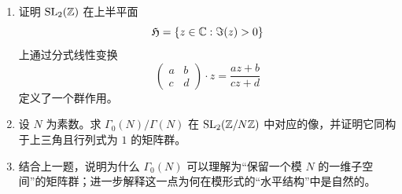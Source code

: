 \begin{enumerate}[start=56, label=\textbf{习题6.\arabic*.}, leftmargin=7em]
  \[
    \SL_2(\Z)/\Gamma(N) \cong \SL_2(\Z/N\Z).
  \]
  \item \hard 证明 $\mathrm{SL}_2(\mathbb{Z})$ 在上半平面
  \[
    \mathfrak{H}=\{z\in \mathbb{C}: \Im(z)>0\}
  \]
  上通过分式线性变换
  \[
    \begin{pmatrix}a&b\\ c&d\end{pmatrix}·z=\frac{az+b}{cz+d}
  \]
  定义了一个群作用。
  \item \hard 设 $N$ 为素数。求 $\Gamma_0(N)/\Gamma(N)$ 在 $\mathrm{SL}_2(\mathbb{Z}/N\mathbb{Z})$ 中对应的像，并证明它同构于上三角且行列式为 $1$ 的矩阵群。
  \item \hard 结合上一题，说明为什么 $\Gamma_0(N)$ 可以理解为“保留一个模 $N$ 的一维子空间”的矩阵群；进一步解释这一点为何在模形式的“水平结构”中是自然的。
\end{enumerate}
